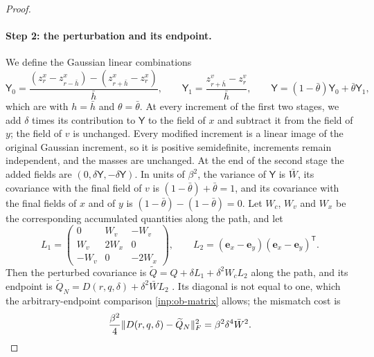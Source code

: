 \begin{proof}
\paragraph{Step 2: the perturbation and its endpoint.} We define the Gaussian linear combinations
\[
 \mathsf Y_0=\frac{(z^x_r-z^x_{r-\bar h})-(z^x_{r+\bar h}-z^x_r)}{\bar h},\qquad
 \mathsf Y_1=\frac{z^v_{r+\bar h}-z^v_r}{\bar h},\qquad
 \mathsf Y=(1-\bar\theta)\mathsf Y_0+\bar\theta\mathsf Y_1,
\]
which are \cite[(7.8)]{oai-barriers} with $h=\bar h$ and $\theta=\bar\theta$. At every increment of the first two stages, we add $\delta$ times its contribution to $\mathsf Y$ to the field of $x$ and subtract it from the field of $y$; the field of $v$ is unchanged. Every modified increment is a linear image of the original Gaussian increment, so it is positive semidefinite, increments remain independent, and the masses are unchanged. At the end of the second stage the added fields are $(0,\delta\mathsf Y,-\delta\mathsf Y)$. In units of $\beta^2$, the variance of $\mathsf Y$ is $\bar W$, its covariance with the final field of $v$ is $(1-\bar\theta)+\bar\theta=1$, and its covariance with the final fields of $x$ and of $y$ is $(1-\bar\theta)-(1-\bar\theta)=0$. Let $W_c$, $W_v$ and $W_x$ be the corresponding accumulated quantities along the path, and let
\[
 L_1=\begin{pmatrix}0&W_v&-W_v\\ W_v&2W_x&0\\ -W_v&0&-2W_x\end{pmatrix},\qquad
 L_2=(\mathbf e_x-\mathbf e_y)(\mathbf e_x-\mathbf e_y)^{\mathsf T}.
\]
Then the perturbed covariance is $\widetilde Q=Q+\delta L_1+\delta^2W_cL_2$ along the path, and its endpoint is $\widetilde Q_N=D(r,q,\delta)+\delta^2\bar WL_2$ \cite[(7.10), (7.12)]{oai-barriers}. Its diagonal is not equal to one, which the arbitrary-endpoint comparison \cref{inp:ob-matrix} allows; the mismatch cost is
\begin{equation}\label{eq:st-mismatch}
 \frac{\beta^2}4\lVert D(r,q,\delta)-\widetilde Q_N\rVert_F^2=\beta^2\delta^4\bar W^2.
\end{equation}


\end{proof}

